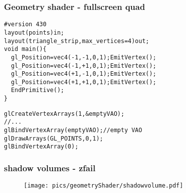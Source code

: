 \begin{frame}[fragile]
\frametitle{Geometry shader - fullscreen quad}
	{\scriptsize
\begin{verbatim}
#version 430
layout(points)in;
layout(triangle_strip,max_vertices=4)out;
void main(){
  gl_Position=vec4(-1,-1,0,1);EmitVertex();
  gl_Position=vec4(-1,+1,0,1);EmitVertex();
  gl_Position=vec4(+1,-1,0,1);EmitVertex();
  gl_Position=vec4(+1,+1,0,1);EmitVertex();
  EndPrimitive();
}
	\end{verbatim}
	}
	{\scriptsize
\begin{verbatim}
glCreateVertexArrays(1,&emptyVAO);
//...
glBindVertexArray(emptyVAO);//empty VAO
glDrawArrays(GL_POINTS,0,1);
glBindVertexArray(0);
	\end{verbatim}
	}
\end{frame}

\begin{frame}[fragile]
\frametitle{shadow volumes - zfail}
  \begin{figure}[h]
    \texttt{[image: pics/geometryShader/shadowvolume.pdf]}
  \end{figure}
\end{frame}


